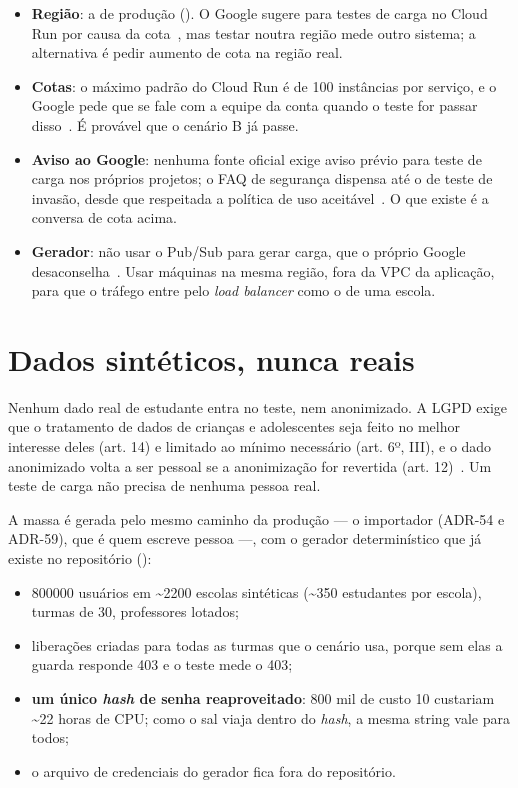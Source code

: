 \documentclass[11pt, a4paper, oneside, openany]{report}
\begin{document}
\begin{itemize}
  \item \textbf{Região}: a de produção (). O Google
    sugere  para testes de carga no Cloud Run por causa da
    cota~\cite{gcrloadtest}, mas testar noutra região mede outro sistema; a
    alternativa é pedir aumento de cota na região real.
  \item \textbf{Cotas}: o máximo padrão do Cloud Run é de 100 instâncias por
    serviço, e o Google pede que se fale com a equipe da conta quando o teste
    for passar disso~\cite{gcrloadtest}. É provável que o cenário B já passe.
  \item \textbf{Aviso ao Google}: nenhuma fonte oficial exige aviso prévio para
    teste de carga nos próprios projetos; o FAQ de segurança dispensa até o de
    teste de invasão, desde que respeitada a política de uso
    aceitável~\cite{gcppentestfaq}. O que existe é a conversa de cota acima.
  \item \textbf{Gerador}: não usar o Pub/Sub para gerar carga, que o próprio
    Google desaconselha~\cite{gcrloadtest}. Usar máquinas na mesma região, fora
    da VPC da aplicação, para que o tráfego entre pelo \emph{load balancer} como
    o de uma escola.
\end{itemize}

\section{Dados sintéticos, nunca reais}

\begin{regra}
Nenhum dado real de estudante entra no teste, nem anonimizado. A LGPD exige que o
tratamento de dados de crianças e adolescentes seja feito no melhor interesse
deles (art. 14) e limitado ao mínimo necessário (art. 6º, III), e o dado
anonimizado volta a ser pessoal se a anonimização for revertida
(art. 12)~\cite{lgpd2018}. Um teste de carga não precisa de nenhuma pessoa real.
\end{regra}

A massa é gerada pelo mesmo caminho da produção --- o importador (ADR-54 e
ADR-59), que é quem escreve pessoa ---, com o gerador determinístico que já
existe no repositório ():

\begin{itemize}
  \item \num{800000} usuários em \textasciitilde\num{2200} escolas sintéticas
    (\textasciitilde350 estudantes por escola), turmas de 30, professores
    lotados;
  \item liberações criadas para todas as turmas que o cenário usa, porque sem
    elas a guarda responde 403 e o teste mede o 403;
  \item \textbf{um único \emph{hash} de senha reaproveitado}: 800 mil
     de custo 10 custariam \textasciitilde22 horas de CPU; como o
    sal viaja dentro do \emph{hash}, a mesma string vale para todos;
  \item o arquivo de credenciais do gerador fica fora do repositório.
\end{itemize}
\end{document}
